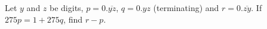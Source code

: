 Let $y$ and $z$ be digits, $p=0.\overline{yz}$, $q=0.yz$ (terminating) and $r=0.\overline{zy}$. If $275p=1+275q$, find $r-p$.

